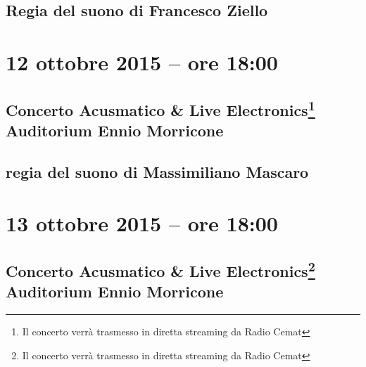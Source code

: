 \documentclass[8pt, twoside, a5paper]{extreport}
\begin{document}
{\fontsize{30}{30} }

\subsection*{\textsf{Regia del suono di Francesco Ziello}}

\bigskip

\begin{multicols}{2}




\end{multicols}

\clearpage

\section*{12 ottobre 2015 -- ore 18:00}

\subsection*{{\small Concerto Acusmatico \& Live Electronics\footnote{ Il concerto verrà trasmesso in diretta streaming da Radio Cemat}} \\
	\textsf{Auditorium Ennio Morricone}}

{\fontsize{30}{30} }

\subsection*{\textsf{regia del suono di Massimiliano Mascaro}}

\bigskip

\begin{multicols}{2}




\end{multicols}

\clearpage

\section*{13 ottobre 2015 -- ore 18:00}

\subsection*{{\small Concerto Acusmatico \& Live Electronics\footnote{ Il concerto verrà trasmesso in diretta streaming da Radio Cemat}} \\
	\textsf{Auditorium Ennio Morricone}}
\end{document}
